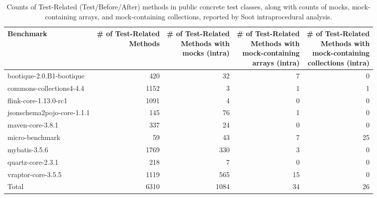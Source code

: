 \begin{table*}
	\centering
	\caption{Counts of Test-Related (Test/Before/After) methods in public concrete test classes, along with counts of mocks, mock-containing arrays, and mock-containing collections, reported by Soot intraprocedural analysis.}
	\vspace*{.5em}
	\begin{tabular}{lrrrr}
		\toprule
		Benchmark & \thead{\# of Test-Related \\ Methods} & \thead{\# of Test-Related \\ Methods with \\ mocks (intra)}  & \thead{\# of Test-Related \\ Methods with \\ mock-containing\\ arrays (intra)} & \thead{\# of Test-Related \\ Methods with \\ mock-containing\\ collections (intra)} \\
		\midrule
		bootique-2.0.B1-bootique           		&  420        &  32  & 7 & 0       \\
		commons-collections4-4.4          		&  1152       &  3   & 1 & 1       \\
		flink-core-1.13.0-rc1           		&  1091       &  4   & 0 & 0       \\
		jsonschema2pojo-core-1.1.1           	&  145        &  76  & 1 & 0       \\
		maven-core-3.8.1	           			&  337        &  24  & 0 & 0       \\
		micro-benchmark         		  		&  59         &  43  & 7 & 25       \\
		mybatis-3.5.6         		  			&  1769       &  330 & 3 & 0       \\
		
		quartz-core-2.3.1         	  			&  218     	  &  7   & 0 & 0      \\
		vraptor-core-3.5.5         	  			&  1119       &  565 & 15 & 0      \\
		\bottomrule
		Total        	  						&  6310       &  1084  & 34 & 26    \\
	\end{tabular}
	\label{tab:mocks}
\end{table*}

